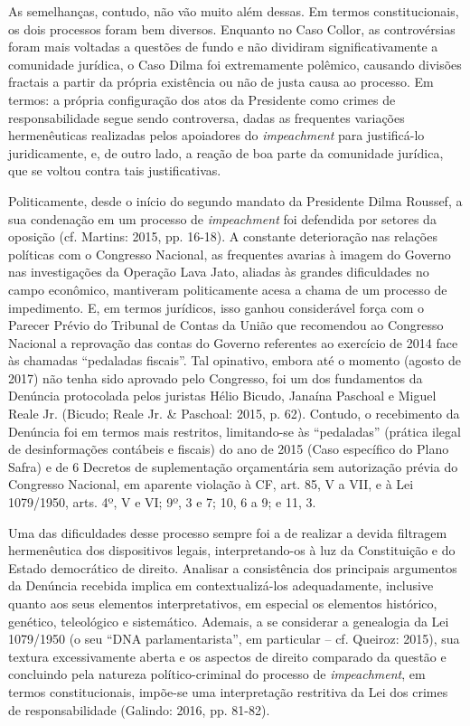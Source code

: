 As semelhanças, contudo, não vão muito além dessas. Em termos
constitucionais, os dois processos foram bem diversos. Enquanto no Caso
Collor, as controvérsias foram mais voltadas a questões de fundo e não
dividiram significativamente a comunidade jurídica, o Caso Dilma foi
extremamente polêmico, causando divisões fractais a partir da própria
existência ou não de justa causa ao processo. Em termos: a própria
configuração dos atos da Presidente como crimes de responsabilidade
segue sendo controversa, dadas as frequentes variações hermenêuticas
realizadas pelos apoiadores do \emph{impeachment} para justificá-lo
juridicamente, e, de outro lado, a reação de boa parte da comunidade
jurídica, que se voltou contra tais justificativas.

Politicamente, desde o início do segundo mandato da Presidente Dilma
Roussef, a sua condenação em um processo de \emph{impeachment} foi
defendida por setores da oposição (cf. Martins: 2015, pp. 16-18). A
constante deterioração nas relações políticas com o Congresso Nacional,
as frequentes avarias à imagem do Governo nas investigações da Operação
Lava Jato, aliadas às grandes dificuldades no campo econômico,
mantiveram politicamente acesa a chama de um processo de impedimento. E,
em termos jurídicos, isso ganhou considerável força com o Parecer Prévio
do Tribunal de Contas da União que recomendou ao Congresso Nacional a
reprovação das contas do Governo referentes ao exercício de 2014 face às
chamadas ``pedaladas fiscais''. Tal opinativo, embora até o momento
(agosto de 2017) não tenha sido aprovado pelo Congresso, foi um dos
fundamentos da Denúncia protocolada pelos juristas Hélio Bicudo, Janaína
Paschoal e Miguel Reale Jr. (Bicudo; Reale Jr. \& Paschoal: 2015, p.
62). Contudo, o recebimento da Denúncia foi em termos mais restritos,
limitando-se às ``pedaladas'' (prática ilegal de desinformações
contábeis e fiscais) do ano de 2015 (Caso específico do Plano Safra) e
de 6 Decretos de suplementação orçamentária sem autorização prévia do
Congresso Nacional, em aparente violação à CF, art. 85, V a VII, e à Lei
1079/1950, arts. 4º, V e VI; 9º, 3 e 7; 10, 6 a 9; e 11, 3.

Uma das dificuldades desse processo sempre foi a de realizar a devida
filtragem hermenêutica dos dispositivos legais, interpretando-os à luz
da Constituição e do Estado democrático de direito. Analisar a
consistência dos principais argumentos da Denúncia recebida implica em
contextualizá-los adequadamente, inclusive quanto aos seus elementos
interpretativos, em especial os elementos histórico, genético,
teleológico e sistemático. Ademais, a se considerar a genealogia da Lei
1079/1950 (o seu ``DNA parlamentarista'', em particular -- cf. Queiroz:
2015), sua textura excessivamente aberta e os aspectos de direito
comparado da questão e concluindo pela natureza político-criminal do
processo de \emph{impeachment}, em termos constitucionais, impõe-se uma
interpretação restritiva da Lei dos crimes de responsabilidade (Galindo:
2016, pp. 81-82).


